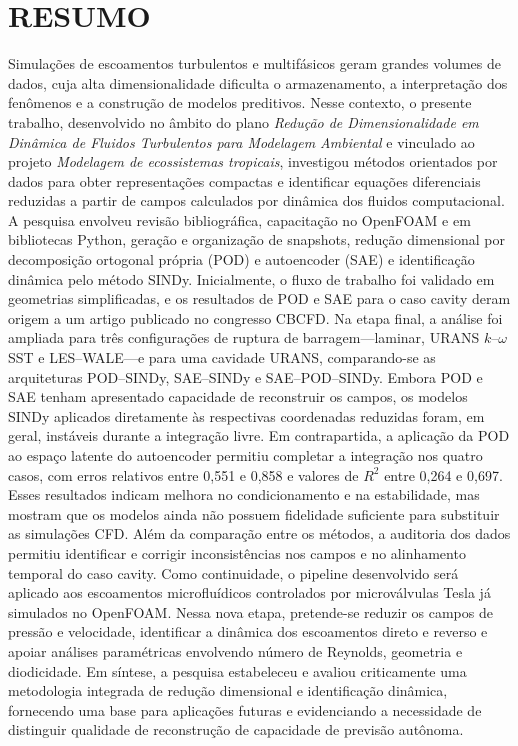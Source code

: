 \documentclass[12pt,a4paper]{article}
\begin{document}
\clearpage{}\setcounter{page}{1}
\section*{RESUMO}
Simulações de escoamentos turbulentos e multifásicos geram grandes volumes de dados, cuja alta dimensionalidade dificulta o armazenamento, a interpretação dos fenômenos e a construção de modelos preditivos. Nesse contexto, o presente trabalho, desenvolvido no âmbito do plano \textit{Redução de Dimensionalidade em Dinâmica de Fluidos Turbulentos para Modelagem Ambiental} e vinculado ao projeto \textit{Modelagem de ecossistemas tropicais}, investigou métodos orientados por dados para obter representações compactas e identificar equações diferenciais reduzidas a partir de campos calculados por dinâmica dos fluidos computacional. A pesquisa envolveu revisão bibliográfica, capacitação no OpenFOAM e em bibliotecas Python, geração e organização de snapshots, redução dimensional por decomposição ortogonal própria (POD) e autoencoder (SAE) e identificação dinâmica pelo método SINDy. Inicialmente, o fluxo de trabalho foi validado em geometrias simplificadas, e os resultados de POD e SAE para o caso cavity deram origem a um artigo publicado no congresso CBCFD. Na etapa final, a análise foi ampliada para três configurações de ruptura de barragem---laminar, URANS $k$--$\omega$ SST e LES--WALE---e para uma cavidade URANS, comparando-se as arquiteturas POD--SINDy, SAE--SINDy e SAE--POD--SINDy. Embora POD e SAE tenham apresentado capacidade de reconstruir os campos, os modelos SINDy aplicados diretamente às respectivas coordenadas reduzidas foram, em geral, instáveis durante a integração livre. Em contrapartida, a aplicação da POD ao espaço latente do autoencoder permitiu completar a integração nos quatro casos, com erros relativos entre 0,551 e 0,858 e valores de $R^2$ entre 0,264 e 0,697. Esses resultados indicam melhora no condicionamento e na estabilidade, mas mostram que os modelos ainda não possuem fidelidade suficiente para substituir as simulações CFD. Além da comparação entre os métodos, a auditoria dos dados permitiu identificar e corrigir inconsistências nos campos e no alinhamento temporal do caso cavity. Como continuidade, o pipeline desenvolvido será aplicado aos escoamentos microfluídicos controlados por microválvulas Tesla já simulados no OpenFOAM. Nessa nova etapa, pretende-se reduzir os campos de pressão e velocidade, identificar a dinâmica dos escoamentos direto e reverso e apoiar análises paramétricas envolvendo número de Reynolds, geometria e diodicidade. Em síntese, a pesquisa estabeleceu e avaliou criticamente uma metodologia integrada de redução dimensional e identificação dinâmica, fornecendo uma base para aplicações futuras e evidenciando a necessidade de distinguir qualidade de reconstrução de capacidade de previsão autônoma.
\end{document}
